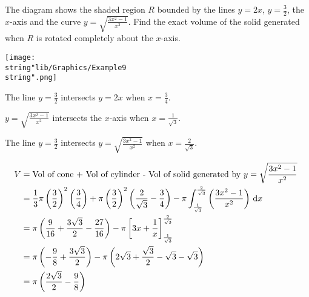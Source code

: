 \documentclass[11pt,a4paper]{book}
\begin{document}
\begin{example}

The diagram shows the shaded region $R$ bounded by the lines $y=2x$,
${\displaystyle y=\frac{3}{2}}$, the $x$-axis and the curve ${\displaystyle y=\sqrt{\frac{3x^{2}-1}{x^{2}}}}$.
Find the exact volume of the solid generated when $R$ is rotated
completely about the $x$-axis.
\begin{center}
\texttt{[image: \\string"lib/Graphics/Example9\\string".png]}
\par\end{center}

\Solution

The line ${\displaystyle y=\frac{3}{2}}$ intersects $y=2x$ when
${\displaystyle x=\frac{3}{4}}$.

${\displaystyle y=\sqrt{\frac{3x^{2}-1}{x^{2}}}}$ intersects the
$x$-axis when ${\displaystyle x=\frac{1}{\sqrt{3}}}$.

The line ${\displaystyle y=\frac{3}{2}}$ intersects ${\displaystyle y=\sqrt{\frac{3x^{2}-1}{x^{2}}}}$
when ${\displaystyle x=\frac{2}{\sqrt{3}}}$.

\begin{align*}
V & =\text{Vol of cone + Vol of cylinder - Vol of solid generated by \ensuremath{{\displaystyle y=\sqrt{\frac{3x^{2}-1}{x^{2}}}}} }\\
 & =\frac{1}{3}\pi\left(\frac{3}{2}\right)^{2}\left(\frac{3}{4}\right)+\pi\left(\frac{3}{2}\right)^{2}\left(\frac{2}{\sqrt{3}}-\frac{3}{4}\right)-\pi\int_{\frac{1}{\sqrt{3}}}^{\frac{2}{\sqrt{3}}}\left(\frac{3x^{2}-1}{x^{2}}\right)\,\mathrm{d}x\\
 & =\pi\left(\frac{9}{16}+\frac{3\sqrt{3}}{2}-\frac{27}{16}\right)-\pi\left[3x+\frac{1}{x}\right]_{\frac{1}{\sqrt{3}}}^{\frac{2}{\sqrt{3}}}\\
 & =\pi\left(-\frac{9}{8}+\frac{3\sqrt{3}}{2}\right)-\pi\left(2\sqrt{3}+\frac{\sqrt{3}}{2}-\sqrt{3}-\sqrt{3}\right)\\
 & =\pi\left(\frac{2\sqrt{3}}{2}-\frac{9}{8}\right)
\end{align*}

\end{example}


\newpage
\end{document}
